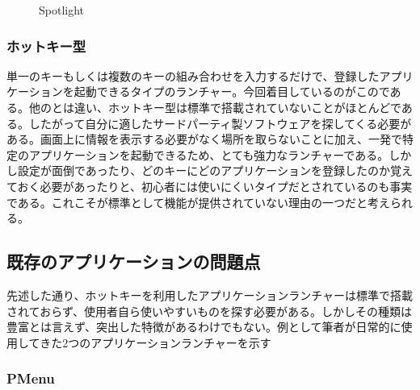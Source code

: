 \begin{figure}[h]
    \begin{center}
    \end{center}
    \caption{Spotlight}
    \label{fig:spotlight}
\end{figure}

\subsubsection{ホットキー型}

単一のキーもしくは複数のキーの組み合わせを入力するだけで、登録したアプリケーションを起動できるタイプのランチャー。今回着目しているのがこのである。他のとは違い、ホットキー型は標準で搭載されていないことがほとんどである。したがって自分に適したサードパーティ製ソフトウェアを探してくる必要がある。画面上に情報を表示する必要がなく場所を取らないことに加え、一発で特定のアプリケーションを起動できるため、とても強力なランチャーである。しかし設定が面倒であったり、どのキーにどのアプリケーションを登録したのか覚えておく必要があったりと、初心者には使いにくいタイプだとされているのも事実である。これこそが標準として機能が提供されていない理由の一つだと考えられる。

\subsection{既存のアプリケーションの問題点}

先述した通り、ホットキーを利用したアプリケーションランチャーは標準で搭載されておらず、使用者自ら使いやすいものを探す必要がある。しかしその種類は豊富とは言えず、突出した特徴があるわけでもない。例として筆者が日常的に使用してきた2つのアプリケーションランチャーを示す

\subsubsection{PMenu}


